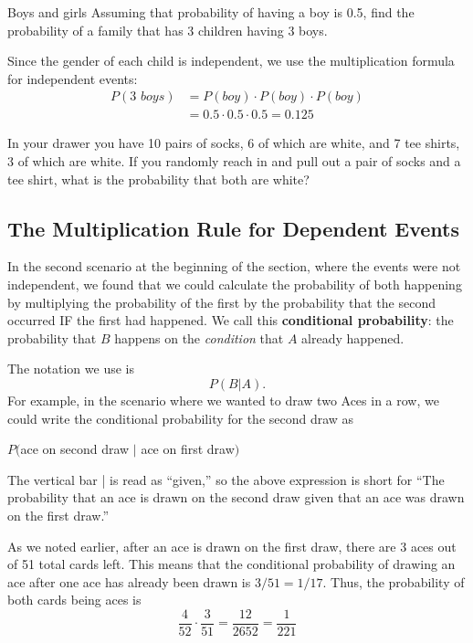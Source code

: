 \begin{example}[https://www.youtube.com/watch?v=670VxNZAcP8&list=PLfmpjsIzhzts14-9s5QixRje97EI2oeMF&index=22]{Boys and girls}
Assuming that probability of having a boy is 0.5, find the probability of a family that has 3 children having 3 boys. 

\sol
Since the gender of each child is independent, we use the multiplication formula for independent events:
\begin{align*}
P(\mbox{3 } boys ) &= P(boy) \cdot P(boy) \cdot P(boy)\\
&= 0.5 \cdot 0.5 \cdot 0.5 = \boxed{0.125}
\end{align*}
\end{example}

\begin{try}
In your drawer you have 10 pairs of socks, 6 of which are white, and 7 tee shirts, 3 of which are white. If you randomly reach in and pull out a pair of socks and a tee shirt, what is the probability that both are white?
\end{try}

\subsection{The Multiplication Rule for Dependent Events}
In the second scenario at the beginning of the section, where the events were not independent, we found that we could calculate the probability of both happening by multiplying the probability of the first by the probability that the second occurred IF the first had happened.  We call this \textbf{conditional probability}: the probability that $B$ happens on the \emph{condition} that $A$ already happened.

The notation we use is \[P(B | A).\]
For example, in the scenario where we wanted to draw two Aces in a row, we could write the conditional probability for the second draw as 
\begin{center}
$P($ace on second draw $|$ ace on first draw$)$
\end{center}

The vertical bar | is read as ``given,'' so the above expression is short for ``The probability that an ace is drawn on the second draw given that an ace was drawn on the first draw.'' 
\pagebreak

As we noted earlier, after an ace is drawn on the first draw, there are 3 aces out of 51 total cards left. This means that the conditional probability of drawing an ace after one ace has already been drawn is $3/51 = 1/17$. Thus, the probability of both cards being aces is
\[ \frac{4}{52} \cdot \frac{3}{51} = \frac{12}{2652} = \frac{1}{221} \]

